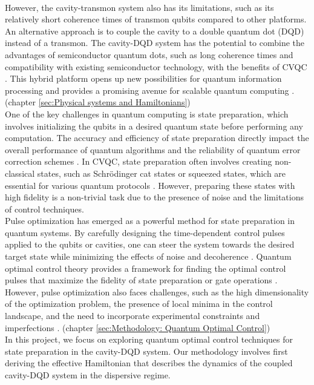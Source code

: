 \documentclass[12pt]{report}
\begin{document}
\\
However, the cavity-transmon system also has its limitations, such as its relatively short coherence times of transmon qubits compared to other platforms. 
An alternative approach is to couple the cavity to a double quantum dot (DQD) instead of a transmon. 
The cavity-DQD system has the potential to combine the advantages of semiconductor quantum dots, such as long coherence times and compatibility with existing semiconductor technology, with the benefits of CVQC \cite{Mi2018}. 
This hybrid platform opens up new possibilities for quantum information processing and provides a promising avenue for scalable quantum computing \cite{Burkard2020}. (chapter \ref{sec:Physical systems and Hamiltonians})
\\
One of the key challenges in quantum computing is state preparation, which involves initializing the qubits in a desired quantum state before performing any computation. 
The accuracy and efficiency of state preparation directly impact the overall performance of quantum algorithms and the reliability of quantum error correction schemes \cite{Shen2017}. 
In CVQC, state preparation often involves creating non-classical states, such as Schrödinger cat states or squeezed states, which are essential for various quantum protocols \cite{Joshi_2021}. 
However, preparing these states with high fidelity is a non-trivial task due to the presence of noise and the limitations of control techniques.
\\
Pulse optimization has emerged as a powerful method for state preparation in quantum systems. 
By carefully designing the time-dependent control pulses applied to the qubits or cavities, one can steer the system towards the desired target state while minimizing the effects of noise and decoherence \cite{Khaneja2005}. 
Quantum optimal control theory provides a framework for finding the optimal control pulses that maximize the fidelity of state preparation or gate operations \cite{Glaser2015}. 
However, pulse optimization also faces challenges, such as the high dimensionality of the optimization problem, the presence of local minima in the control landscape, and the need to incorporate experimental constraints and imperfections \cite{Koch2016}. (chapter \ref{sec:Methodology: Quantum Optimal Control})
\\
In this project, we focus on exploring quantum optimal control techniques for state preparation in the cavity-DQD system. 
Our methodology involves first deriving the effective Hamiltonian that describes the dynamics of the coupled cavity-DQD system in the dispersive regime. 
\end{document}
